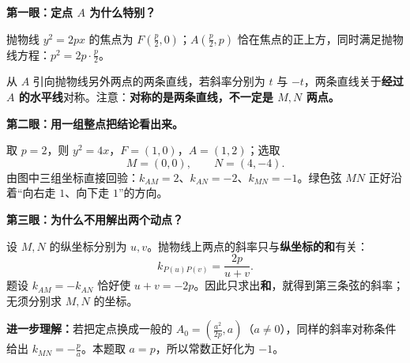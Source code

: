 \clearpage
\begin{explanationbox}
\textbf{第一眼：定点 $A$ 为什么特别？}

抛物线 $y^2=2px$ 的焦点为 $F(\frac p2,0)$；$A(\frac p2,p)$ 恰在焦点的正上方，同时满足抛物线方程：$p^2=2p\cdot\frac p2$。

从 $A$ 引向抛物线另外两点的两条直线，若斜率分别为 $t$ 与 $-t$，两条直线关于\textbf{经过 $A$ 的水平线}对称。注意：\textbf{对称的是两条直线，不一定是 $M,N$ 两点。}

\medskip
\textbf{第二眼：用一组整点把结论看出来。}
\begin{center}\end{center}


取 $p=2$，则 $y^2=4x$，$F=(1,0)$，$A=(1,2)$；选取
\[
 M=(0,0),\qquad N=(4,-4).
\]
由图中三组坐标直接回验：$k_{AM}=2$、$k_{AN}=-2$、$k_{MN}=-1$。绿色弦 $MN$ 正好沿着“向右走 $1$、向下走 $1$”的方向。

\medskip
\textbf{第三眼：为什么不用解出两个动点？}

设 $M,N$ 的纵坐标分别为 $u,v$。抛物线上两点的斜率只与\textbf{纵坐标的和}有关：
\[
 \boxed{k_{P(u)P(v)}=\frac{2p}{u+v}}.
\]
题设 $k_{AM}=-k_{AN}$ 恰好使 $u+v=-2p$。因此只求出\textbf{和}，就得到第三条弦的斜率；无须分别求 $M,N$ 的坐标。

\medskip
\textbf{进一步理解：}若把定点换成一般的 $A_0=(\frac{a^2}{2p},a)$（$a\neq0$），同样的斜率对称条件给出 $k_{MN}=-\frac pa$。本题取 $a=p$，所以常数正好化为 $-1$。
\end{explanationbox}

